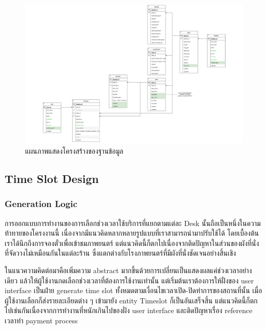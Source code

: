 \begin{landscape}
    \begin{figure}[ht]
        \begin{center}
            \includegraphics[width=8.1in]{./image/Database_schema_1.png}
        \end{center}
        \caption[Database Schema]{แผนภาพแสดงโครงสร้างของฐานข้อมูล}
        \label{fig:Database_schema_1}
    \end{figure}
\end{landscape}

\subsection{Time Slot Design}
\subsubsection{Generation Logic}
การออกแบบการทำงานของการเลือกช่วงเวลาใช้บริการที่แยกตามแต่ละ Desk นั้นถือเป็นหนึ่งในความท้าทายของโครงงานนี้ เนื่องจากมีแนวคิดหลากหลายรูปแบบที่เราสามารถนำมาปรับใช้ได้ โดยเบื้องต้นเราได้นึกถึงการจองตั๋วเพื่อเข้าชมภาพยนตร์ แต่แนวคิดนี้ก็ตกไปเนื่องจากติดปัญหาในส่วนของผังที่นั่งที่จัดวางไม่เหมือนกันในแต่ละร้าน ซึ่งแตกต่างกับโรงภาพยนตร์ที่มีผังที่นั่งชัดเจนอย่างสิ้นเชิง

ในแนวความคิดต่อมาคือเพิ่มความ abstract มากขึ้นด้วยการเปลี่ยนเป็นแสดงผลแค่ช่วงเวลาอย่างเดียว แล้วให้ผู้ใช้งานกดเลือกช่วงเวลาที่ต้องการใช้งานเท่านั้น แต่เริ่มต้นเราต้องการให้ฝั่งของ user interface เป็นฝ่าย generate time slot ทั้งหมดตามเงื่อนไขเวลาเปิด-ปิดทำการของสถานที่นั้น เมื่อผู้ใช้งานเลือกก็ส่งรายละเอียดต่าง ๆ เข้ามายัง entity Timeslot ก็เป็นอันเสร็จสิ้น แต่แนวคิดนี้ก็ตกไปเช่นกันเนื่องจากการทำงานที่หนักเกินไปของฝั่ง user interface และติดปัญหาเรื่อง reference เวลาทำ payment process


